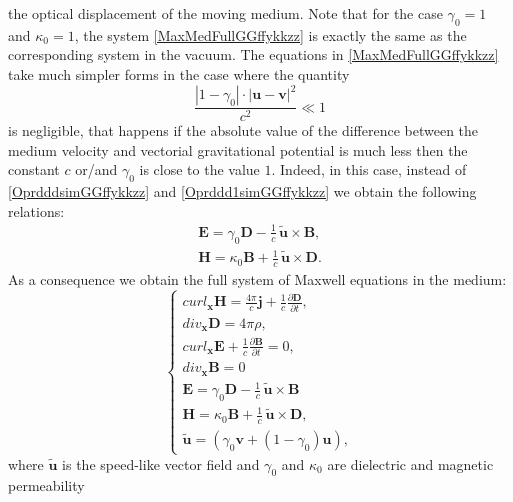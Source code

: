 \documentclass{article}
\theoremstyle{definition}
\theoremstyle{remark}
\renewcommand{\vec}[1]{\mathbf{#1}}
\newcommand{\R}{\mathbb{R}}
\newcommand{\er}{\eqref}
\newcommand{\R}{{\mathbb{R}}}
\newcommand{\er}{\eqref}
\begin{document}
the optical displacement of the moving medium. Note that for the
case $\gamma_0=1$ and $\kappa_0=1$, the system
\er{MaxMedFullGGffykkzz} is exactly the same as the corresponding
system in the vacuum. The equations in \er{MaxMedFullGGffykkzz} take
much simpler forms in the case where the quantity
\begin{equation}\label{OprdddsimGGffyhjyhhtygrffgfzz}
\frac{|1-\gamma_0|\cdot|\vec u-\vec v|^2}{c^2}\ll 1
\end{equation} is
negligible, that happens if the absolute value of the difference
between the medium velocity and vectorial gravitational potential is
much less then the constant $c$ or/and $\gamma_0$ is close to the
value $1$. Indeed, in this case, instead of \er{OprdddsimGGffykkzz}
and \er{Oprddd1simGGffykkzz} we obtain the following relations:
\begin{align}\label{OprdddsimsimsimGG}
\vec E=\gamma_0\vec D-\frac{1}{c}\,\vec {\tilde u}\times \vec B,\\
\label{Oprddd1simsimsimGG}
\vec H=\kappa_0\vec B+\frac{1}{c}\,\vec {\tilde u}\times \vec D.
\end{align}
As a consequence we obtain the full system of Maxwell equations in
the medium:
\begin{equation}\label{MaxMedFullGGffykkhjhhzz}
\begin{cases}
curl_{\vec x} \vec H=\frac{4\pi}{c}\vec j+
\frac{1}{c}\frac{\partial \vec D}{\partial t},\\
div_{\vec x} \vec D=4\pi\rho,\\
curl_{\vec x} \vec E+\frac{1}{c}\frac{\partial \vec B}{\partial t}=0,\\
div_{\vec x} \vec B=0\\
\vec E=\gamma_0\vec D-\frac{1}{c}\,\vec {\tilde u}\times \vec B\\
\vec H=\kappa_0\vec B+\frac{1}{c}\,\vec {\tilde u}\times \vec D,\\
\vec {\tilde u}=\left(\gamma_0\vec v+(1-\gamma_0)\vec u\right),
\end{cases}
\end{equation}
where $\vec {\tilde u}$ is the speed-like vector field and
$\gamma_0$ and $\kappa_0$ are dielectric and magnetic permeability
\end{document}
